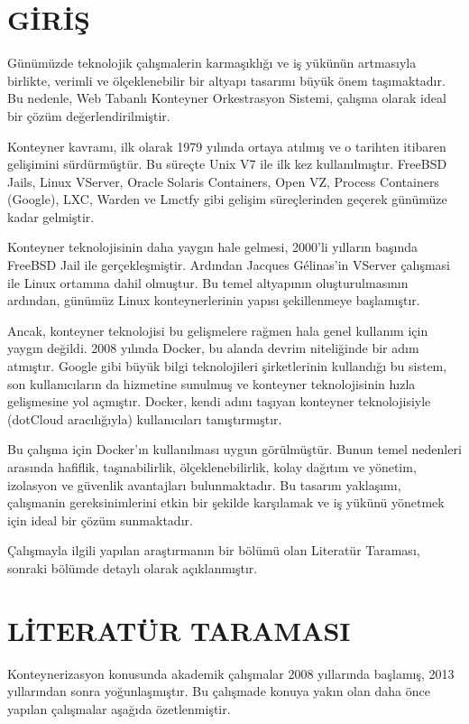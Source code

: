 \section{GİRİŞ}
Günümüzde teknolojik çalışmalerin karmaşıklığı ve iş yükünün artmasıyla birlikte, verimli ve ölçeklenebilir bir altyapı tasarımı büyük önem taşımaktadır. Bu nedenle, Web Tabanlı Konteyner Orkestrasyon Sistemi, çalışma olarak ideal bir çözüm değerlendirilmiştir.

Konteyner kavramı, ilk olarak 1979 yılında ortaya atılmış ve o tarihten itibaren gelişimini sürdürmüştür. Bu süreçte Unix V7 ile ilk kez kullanılmıştır. FreeBSD Jails, Linux VServer, Oracle Solaris Containers, Open VZ, Process Containers (Google), LXC, Warden ve Lmctfy gibi gelişim süreçlerinden geçerek günümüze kadar gelmiştir.

Konteyner teknolojisinin daha yaygın hale gelmesi, 2000'li yılların başında FreeBSD Jail ile gerçekleşmiştir. Ardından Jacques Gélinas'in VServer çalışmasi ile Linux ortamına dahil olmuştur. Bu temel altyapının oluşturulmasının ardından, günümüz Linux konteynerlerinin yapısı şekillenmeye başlamıştır.

Ancak, konteyner teknolojisi bu gelişmelere rağmen hala genel kullanım için yaygın değildi. 2008 yılında Docker, bu alanda devrim niteliğinde bir adım atmıştır. Google gibi büyük bilgi teknolojileri şirketlerinin kullandığı bu sistem, son kullanıcıların da hizmetine sunulmuş ve konteyner teknolojisinin hızla gelişmesine yol açmıştır. Docker, kendi adını taşıyan konteyner teknolojisiyle (dotCloud aracılığıyla) kullanıcıları tanıştırmıştır.\cite{container}

Bu çalışma için Docker'ın kullanılması uygun görülmüştür. Bunun temel nedenleri arasında hafiflik, taşınabilirlik, ölçeklenebilirlik, kolay dağıtım ve yönetim, izolasyon ve güvenlik avantajları bulunmaktadır. Bu tasarım yaklaşımı, çalışmanin gereksinimlerini etkin bir şekilde karşılamak ve iş yükünü yönetmek için ideal bir çözüm sunmaktadır.

Çalışmayla ilgili yapılan araştırmanın bir bölümü olan Literatür Taraması, sonraki bölümde detaylı olarak açıklanmıştır.
\section{LİTERATÜR TARAMASI}
Konteynerizasyon konusunda akademik çalışmalar 2008 yıllarında başlamış, 2013 yıllarından sonra yoğunlaşmıştır. Bu çalışmade konuya yakın olan daha önce yapılan çalışmalar aşağıda özetlenmiştir.

